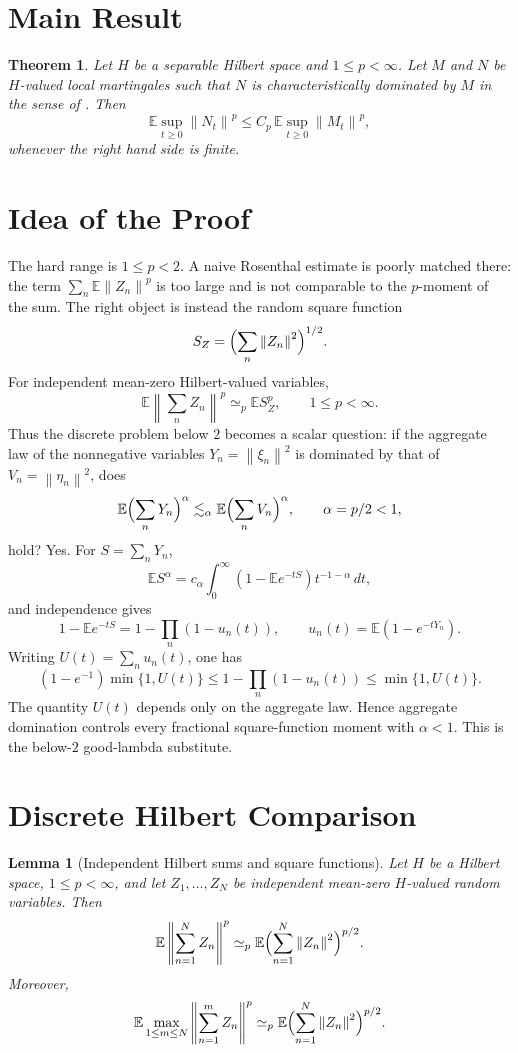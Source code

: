 \documentclass[11pt]{article}
\newtheorem{theorem}{Theorem}
\newtheorem{lemma}{Lemma}
\newcommand{\E}{\mathbb E}
\newcommand{\norm}[1]{\left\lVert #1\right\rVert}
\newcommand{\simequiv}{\simeq}
\begin{document}
\section*{Main Result}

\begin{theorem}\label{thm:hilbert-all-p}
Let \(H\) be a separable Hilbert space and \(1\leq p<\infty\).  Let \(M\) and
\(N\) be \(H\)-valued local martingales such that \(N\) is characteristically
dominated by \(M\) in the sense of \cite{Yaroslavtsev2019}.  Then
\[
  \E\sup_{t\geq0}\norm{N_t}^p
  \leq
  C_p\,\E\sup_{t\geq0}\norm{M_t}^p ,
\]
whenever the right hand side is finite.
\end{theorem}

\section*{Idea of the Proof}

The hard range is \(1\leq p<2\).  A naive Rosenthal estimate is poorly matched
there: the term \(\sum_n\E\norm{Z_n}^p\) is too large and is not comparable to
the \(p\)-moment of the sum.  The right object is instead the random square
function
\[
   S_Z=\Bigl(\sum_n \norm{Z_n}^2\Bigr)^{1/2}.
\]
For independent mean-zero Hilbert-valued variables,
\[
   \E\norm{\sum_n Z_n}^p \simequiv_p \E S_Z^p,
   \qquad 1\leq p<\infty.
\]
Thus the discrete problem below \(2\) becomes a scalar question: if the
aggregate law of the nonnegative variables \(Y_n=\norm{\xi_n}^2\) is dominated
by that of \(V_n=\norm{\eta_n}^2\), does
\[
   \E\Bigl(\sum_nY_n\Bigr)^\alpha
   \lesssim_\alpha
   \E\Bigl(\sum_nV_n\Bigr)^\alpha,
   \qquad \alpha=p/2<1,
\]
hold?  Yes.  For \(S=\sum_nY_n\),
\[
   \E S^\alpha
   =
   c_\alpha\int_0^\infty (1-\E e^{-tS})t^{-1-\alpha}\,dt,
\]
and independence gives
\[
   1-\E e^{-tS}=1-\prod_n(1-u_n(t)),
   \qquad
   u_n(t)=\E(1-e^{-tY_n}).
\]
Writing \(U(t)=\sum_nu_n(t)\), one has
\[
   (1-e^{-1})\min\{1,U(t)\}
   \leq
   1-\prod_n(1-u_n(t))
   \leq
   \min\{1,U(t)\}.
\]
The quantity \(U(t)\) depends only on the aggregate law.  Hence aggregate
domination controls every fractional square-function moment with
\(\alpha<1\).  This is the below-\(2\) good-lambda substitute.

\section*{Discrete Hilbert Comparison}

\begin{lemma}[Independent Hilbert sums and square functions]
\label{lem:hilbert-mz}
Let \(H\) be a Hilbert space, \(1\leq p<\infty\), and let
\(Z_1,\ldots,Z_N\) be independent mean-zero \(H\)-valued random variables.
Then
\[
   \E\norm{\sum_{n=1}^N Z_n}^p
   \simequiv_p
   \E\Bigl(\sum_{n=1}^N\norm{Z_n}^2\Bigr)^{p/2}.
\]
Moreover,
\[
   \E\max_{1\leq m\leq N}\norm{\sum_{n=1}^m Z_n}^p
   \simequiv_p
   \E\Bigl(\sum_{n=1}^N\norm{Z_n}^2\Bigr)^{p/2}.
\]
\end{lemma}
\end{document}
